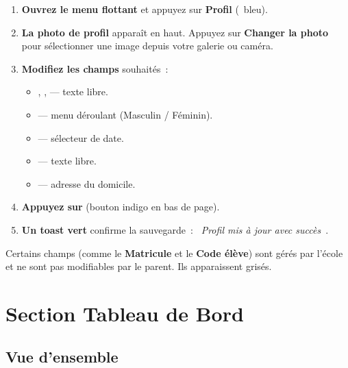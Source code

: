 \begin{etape}[title=Proc\'edure : Modifier le profil]
\begin{enumerate}[leftmargin=1.5cm,label=\textbf{\arabic*.},itemsep=12pt]
  \item \textbf{Ouvrez le menu flottant} et appuyez sur \textbf{Profil} (\faUserEdit\ bleu).

  \item \textbf{La photo de profil} appara\^it en haut. Appuyez sur \textbf{Changer la photo} pour s\'electionner une image depuis votre galerie ou cam\'era.

  \item \textbf{Modifiez les champs} souhait\'es~:
  \begin{itemize}
    \item {}, ,  --- texte libre.
    \item {} --- menu d\'eroulant (Masculin / F\'eminin).
    \item {} --- s\'electeur de date.
    \item {} --- texte libre.
    \item {} --- adresse du domicile.
  \end{itemize}

  \item \textbf{Appuyez sur}  (bouton indigo en bas de page).

  \item \textbf{Un toast vert} confirme la sauvegarde~: \textit{\guillemotleft~Profil mis \`a jour avec succ\`es~\guillemotright}.
\end{enumerate}
\end{etape}

\begin{attention}
Certains champs (comme le \textbf{Matricule} et le \textbf{Code \'el\`eve}) sont g\'er\'es par l'\'ecole et ne sont pas modifiables par le parent. Ils apparaissent gris\'es.
\end{attention}

\newpage
\chapter{Section Tableau de Bord}

\section{Vue d'ensemble}

